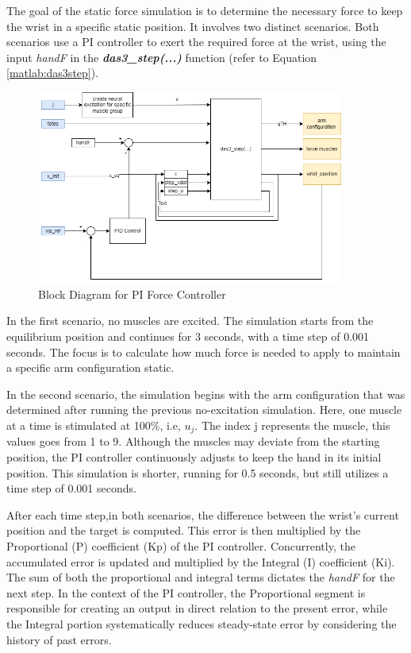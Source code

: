  The goal of the static force simulation is to determine the necessary force to keep the wrist in a specific static position. It involves two distinct scenarios. Both scenarios use a PI controller to exert the required force at the wrist, using the input \textit{handF} in the \textbf{\textit{das3\_step(...)}} function (refer to Equation \ref{matlab:das3step}).

\begin{figure}[h!]
    \centering
    \includegraphics[width=0.9\textwidth]{Pictures/Model/PIController.png}
    \caption{Block Diagram for PI Force Controller}
    \label{fig:PIBlockDiagram}
\end{figure}

In the first scenario, no muscles are excited. The simulation starts from the equilibrium position and continues for 3 seconds, with a time step of 0.001 seconds. The focus is to calculate how much force is needed to apply to maintain a specific arm configuration static.

In the second scenario, the simulation begins with the arm configuration that was determined after running the previous no-excitation simulation. Here, one muscle at a time is stimulated at 100\%, i.e, $u_{j}$. The index j represents the muscle, this values goes from 1 to 9. Although the muscles may deviate from the starting position, the PI controller continuously adjusts to keep the hand in its initial position. This simulation is shorter, running for 0.5 seconds, but still utilizes a time step of 0.001 seconds.

After each time step,in both scenarios, the difference between the wrist's current position and the target is computed. This error is then multiplied by the Proportional (P) coefficient (Kp) of the PI controller. Concurrently, the accumulated error is updated and multiplied by the Integral (I) coefficient (Ki).  The sum of both the proportional and integral terms dictates the \textit{handF} for the next step. In the context of the PI controller, the Proportional segment is responsible for creating an output in direct relation to the present error, while the Integral portion systematically reduces  steady-state error by considering the history of past errors.

